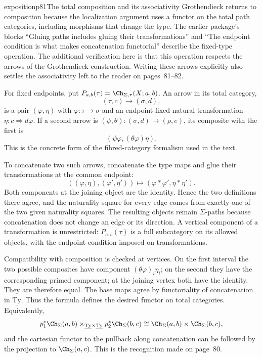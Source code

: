 \begin{dcomment}{exposition}{p81}{The total composition and its associativity}
Grothendieck returns to composition because the localization argument uses a functor on the total path categories, including morphisms that change the type. The earlier package's blocks ``Gluing paths includes gluing their transformations'' and ``The endpoint condition is what makes concatenation functorial'' describe the fixed-type operation. The additional verification here is that this operation respects the arrows of the Grothendieck construction. Writing these arrows explicitly also settles the associativity left to the reader on pages~81--82.

For fixed endpoints, put $P_{a,b}(\tau)=\Ch_{\Sigma,\tau}(X;a,b)$. An arrow in its total category,
\[
 (\tau,c)\longrightarrow(\sigma,d),
\]
is a pair $(\varphi,\eta)$ with $\varphi:\tau\to\sigma$ and an endpoint-fixed natural transformation $\eta:c\Rightarrow d\varphi$. If a second arrow is $(\psi,\theta):(\sigma,d)\to(\rho,e)$, its composite with the first is
\[
 (\psi\varphi,(\theta\varphi)\eta).
\]
This is the concrete form of the fibred-category formalism used in the text.

To concatenate two such arrows, concatenate the type maps and glue their transformations at the common endpoint:
\[
 ((\varphi,\eta),(\varphi',\eta'))
       \longmapsto(\varphi*\varphi',\eta*\eta').
\]
Both components at the joining object are the identity. Hence the two definitions there agree, and the naturality square for every edge comes from exactly one of the two given naturality squares. The resulting objects remain $\Sigma$-paths because concatenation does not change an edge or its direction. A vertical component of a transformation is unrestricted: $P_{a,b}(\tau)$ is a full subcategory on its allowed objects, with the endpoint condition imposed on transformations.

Compatibility with composition is checked at vertices. On the first interval the two possible composites have component $(\theta\varphi)_i\eta_i$; on the second they have the corresponding primed component; at the joining vertex both have the identity. They are therefore equal. The base maps agree by functoriality of concatenation in $\underline{\mathrm{Ty}}$. Thus the formula defines the desired functor on total categories. Equivalently,
\[
 p_1^*\Ch_\Sigma(a,b)\times_{\underline{\mathrm{Ty}}\times\underline{\mathrm{Ty}}}
 p_2^*\Ch_\Sigma(b,c)
 \cong \Ch_\Sigma(a,b)\times\Ch_\Sigma(b,c),
\]
and the cartesian functor to the pullback along concatenation can be followed by the projection to $\Ch_\Sigma(a,c)$. This is the recognition made on page~80.


\end{dcomment}
